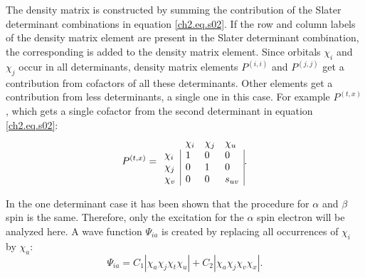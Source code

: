 The density matrix is constructed by summing the contribution of the Slater determinant combinations in equation \ref{ch2.eq.s02}. If the row and column labels of the density matrix element are present in the Slater determinant combination, the corresponding is  added to the density matrix element. Since orbitals $\chi_i$ and $\chi_j$ occur in all determinants, density matrix elements $P^{(i,i)}$ and $P^{(j,j)}$ get a contribution from cofactors of all these determinants. Other elements get a contribution from less determinants, a single one in this case. For example $P^{(t,x)}$, which gets a single cofactor from the second determinant in equation \ref{ch2.eq.s02}:
\begin{equation}
P^{(t,x)}=
\begin{array}{llll}
 &  \chi_i & \chi_j & \chi_u \\
 \chi_i & \multicolumn{1}{|l}{ 1 } & 0 & \multicolumn{1}{l|}{ 0 } \\
 \chi_j & \multicolumn{1}{|l}{ 0 } & 1 & \multicolumn{1}{l|}{ 0 } \\
 \chi_v & \multicolumn{1}{|l}{ 0 } & 0 & \multicolumn{1}{l|}{ s_{uv} }
\end{array}.
\label{ch2.eq.p0examp2}
\end{equation} 

In the one determinant case it has been shown that the procedure for $\alpha$ and $\beta$ spin is the same. Therefore, only the excitation for the $\alpha$ spin electron will be analyzed here. A wave function $\Psi_{ia}$ is created by replacing all occurrences of $\chi_i$ by $\chi_a$:
\begin{equation}
\Psi_{ia} = C_1 |\chi_a\chi_j\chi_t\chi_u|+ C_2 |\chi_a\chi_j\chi_v\chi_x|.
\label{ch2.eq.psi_ia2}
\end{equation}

